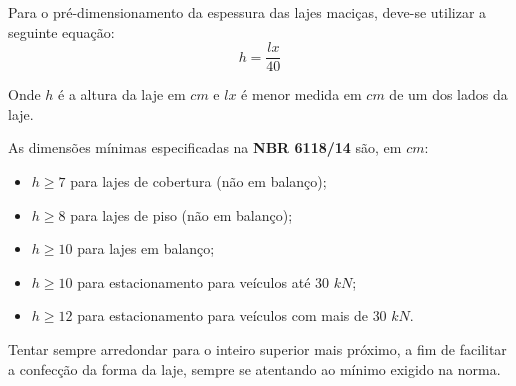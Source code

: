 Para o pré-dimensionamento da espessura das lajes maciças, deve-se utilizar a seguinte equação: $$h = \frac{lx}{40}$$ 

Onde $h$ é a altura da laje em $cm$ e $lx$ é menor medida em $cm$ de um dos lados da laje.

As dimensões mínimas especificadas na \textbf{NBR 6118/14} são, em $cm$:

\begin{itemize}
	\item $h \geqslant 7$ para lajes de cobertura (não em balanço);
	\item $h \geqslant 8$ para lajes de piso (não em balanço);
	\item $h \geqslant 10$ para lajes em balanço;
	\item $h \geqslant 10$ para estacionamento para veículos até $30$ $kN$;
	\item $h \geqslant 12$ para estacionamento para veículos com mais de $30$ $kN$.
\end{itemize}

Tentar sempre arredondar para o inteiro superior mais próximo, a fim de facilitar a confecção da forma da laje, sempre se atentando ao mínimo exigido na norma.